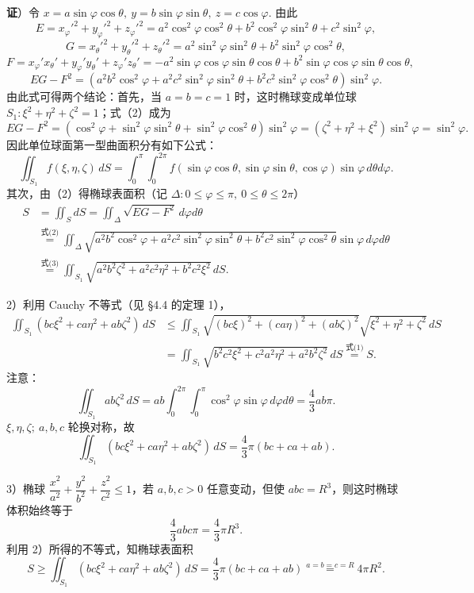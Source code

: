 \documentclass[UTF8, 12pt, fontset=fandol, oneside]{ctexart}
\providecommand{\xlongequal}[1]{\overset{#1}{=}}
\begin{document}
\noindent\textbf{证}）令 $x=a\sin\varphi\cos\theta,\ y=b\sin\varphi\sin\theta,\ z=c\cos\varphi$. 由此
\[
E=x_\varphi'^2+y_\varphi'^2+z_\varphi'^2
=a^2\cos^2\varphi\cos^2\theta+b^2\cos^2\varphi\sin^2\theta+c^2\sin^2\varphi,
\]
\[
G=x_\theta'^2+y_\theta'^2+z_\theta'^2
=a^2\sin^2\varphi\sin^2\theta+b^2\sin^2\varphi\cos^2\theta,
\]
\[
F=x_\varphi'x_\theta'+y_\varphi'y_\theta'+z_\varphi'z_\theta'
=-a^2\sin\varphi\cos\varphi\sin\theta\cos\theta
+b^2\sin\varphi\cos\varphi\sin\theta\cos\theta,
\]
\[
EG-F^2=(a^2b^2\cos^2\varphi+a^2c^2\sin^2\varphi\sin^2\theta+b^2c^2\sin^2\varphi\cos^2\theta)\sin^2\varphi. \tag{2}
\]
由此式可得两个结论：首先，当 $a=b=c=1$ 时，这时椭球变成单位球 $S_1:\xi^2+\eta^2+\zeta^2=1$；式（2）成为
\[
EG-F^2=(\cos^2\varphi+\sin^2\varphi\sin^2\theta+\sin^2\varphi\cos^2\theta)\sin^2\varphi
=(\zeta^2+\eta^2+\xi^2)\sin^2\varphi=\sin^2\varphi.
\]
因此单位球面第一型曲面积分有如下公式：
\[
\iint_{S_1}f(\xi,\eta,\zeta)\,dS
=\int_0^\pi\int_0^{2\pi}f(\sin\varphi\cos\theta,\sin\varphi\sin\theta,\cos\varphi)\sin\varphi\,d\theta d\varphi. \tag{3}
\]
其次，由（2）得椭球表面积（记 $\Delta:0\le\varphi\le\pi,\ 0\le\theta\le2\pi$）
\[
\begin{aligned}
S&=\iint_SdS=\iint_\Delta\sqrt{EG-F^2}\,d\varphi d\theta\\
&\xlongequal{\text{式(2)}}\iint_\Delta\sqrt{a^2b^2\cos^2\varphi+a^2c^2\sin^2\varphi\sin^2\theta+b^2c^2\sin^2\varphi\cos^2\theta}\sin\varphi\,d\varphi d\theta\\
&\xlongequal{\text{式(3)}}\iint_{S_1}\sqrt{a^2b^2\zeta^2+a^2c^2\eta^2+b^2c^2\xi^2}\,dS.
\end{aligned}
\]

2）利用 Cauchy 不等式（见 §4.4 的定理 1），
\[
\begin{aligned}
\iint_{S_1}(bc\xi^2+ca\eta^2+ab\zeta^2)\,dS
&\le\iint_{S_1}\sqrt{(bc\xi)^2+(ca\eta)^2+(ab\zeta)^2}\sqrt{\xi^2+\eta^2+\zeta^2}\,dS\\
&=\iint_{S_1}\sqrt{b^2c^2\xi^2+c^2a^2\eta^2+a^2b^2\zeta^2}\,dS
\xlongequal{\text{式(1)}}S.
\end{aligned}
\]
注意：
\[
\iint_{S_1}ab\zeta^2\,dS
=ab\int_0^{2\pi}\int_0^\pi\cos^2\varphi\sin\varphi\,d\varphi d\theta
=\frac43ab\pi.
\]
$\xi,\eta,\zeta;\ a,b,c$ 轮换对称，故
\[
\iint_{S_1}(bc\xi^2+ca\eta^2+ab\zeta^2)\,dS=\frac43\pi(bc+ca+ab).
\]

3）椭球 $\dfrac{x^2}{a^2}+\dfrac{y^2}{b^2}+\dfrac{z^2}{c^2}\le1$，若 $a,b,c>0$ 任意变动，但使 $abc=R^3$，则这时椭球体积始终等于
\[
\frac43abc\pi=\frac43\pi R^3.
\]
利用 2）所得的不等式，知椭球表面积
\[
S\ge\iint_{S_1}(bc\xi^2+ca\eta^2+ab\zeta^2)\,dS=\frac43\pi(bc+ca+ab)
\xlongequal{a=b=c=R}4\pi R^2.
\]
\end{document}
